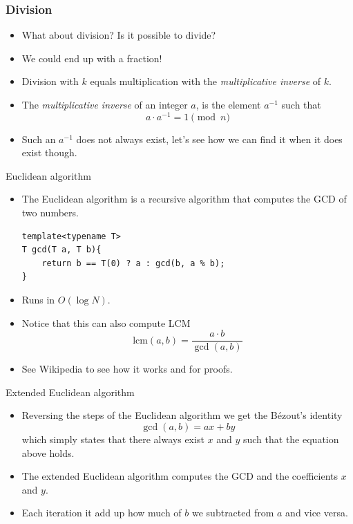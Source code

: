 \documentclass{beamer}
\begin{document}
\begin{frame}[plain]
  \frametitle{Division}
  \vspace{30pt}
  \begin{itemize}
    \item What about division? Is it possible to divide? 
    \item We could end up with a fraction!
    \item Division with $k$ equals multiplication with the \emph{multiplicative
      inverse} of $k$.
    \item The \emph{multiplicative inverse} of an integer $a$, is the element $a^{-1}$ such that
      \[
        a \cdot a^{-1} = 1 \pmod{n}
      \]
   \item<5-> Such an $a^{-1}$ does not always exist, let's see how we can find it when it does exist though.
  \end{itemize}
\end{frame}

\begin{frame}{Euclidean algorithm}
  \vspace{20pt}
  \begin{itemize}
    \item The Euclidean algorithm is a recursive algorithm that computes the GCD of two numbers.
      \begin{verbatim}
template<typename T>
T gcd(T a, T b){
    return b == T(0) ? a : gcd(b, a % b);
}
    \end{verbatim}
    \item Runs in $O(\log N)$.
    \item Notice that this can also compute LCM
      \[
        \text{lcm}(a, b) = \frac{a\cdot b}{\gcd(a,b)}
      \]
    \item See Wikipedia to see how it works and for proofs.
  \end{itemize}
\end{frame}

\begin{frame}[plain]{Extended Euclidean algorithm}
  \vspace{20pt}
  \begin{itemize}
    \item Reversing the steps of the Euclidean algorithm we get the B\'ezout's identity
      \[
        \gcd(a, b) = ax + by
      \]
    which simply states that there always exist $x$ and $y$ such that the equation above holds.
    \item The extended Euclidean algorithm computes the GCD and the coefficients $x$ and $y$.
    \item Each iteration it add up how much of $b$ we subtracted from $a$ and vice versa.
  \end{itemize}
\end{frame}
\end{document}
